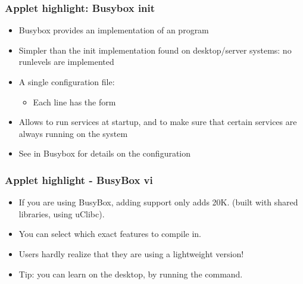 \begin{frame}
  \frametitle{Applet highlight: Busybox init}
  \begin{itemize}
  \item Busybox provides an implementation of an  program
  \item Simpler than the init implementation found on desktop/server
    systems: no runlevels are implemented
  \item A single configuration file: 
    \begin{itemize}
    \item Each line has the form 
    \end{itemize}
  \item Allows to run services at startup, and to make sure that
    certain services are always running on the system
  \item See  in Busybox for details on the
    configuration
  \end{itemize}
\end{frame}

\begin{frame}
  \frametitle{Applet highlight - BusyBox vi}
  \begin{itemize}
  \item If you are using BusyBox, adding  support only adds
    20K. (built with shared libraries, using uClibc).
  \item You can select which exact features to compile in.
  \item Users hardly realize that they are using a lightweight 
    version!
  \item Tip: you can learn  on the desktop, by running the 
    command.
  \end{itemize}
\end{frame}

